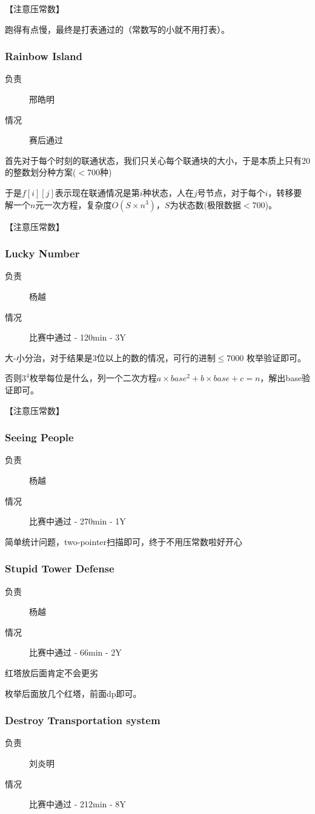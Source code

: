 \documentclass[a4paper, 11pt, nofonts, nocap, fancyhdr]{ctexart}
\newcommand{\problem}[1]{\subsubsection{#1}}
\begin{document}
【注意压常数】

跑得有点慢，最终是打表通过的（常数写的小就不用打表）。

\problem{Rainbow Island}

\begin{description}
\item[负责] 邢皓明
\item[情况] 赛后通过
\end{description}

首先对于每个时刻的联通状态，我们只关心每个联通块的大小，于是本质上只有20的整数划分种方案($<700$种)

于是$f[i][j]$表示现在联通情况是第$i$种状态，人在$j$号节点，对于每个$i$，转移要解一个$n$元一次方程，复杂度$O(S \times n^3)$，$S$为状态数(极限数据$<700$)。

【注意压常数】

\problem{Lucky Number}

\begin{description}
\item[负责] 杨越
\item[情况] 比赛中通过 - 120min - 3Y
\end{description}

大-小分治，对于结果是3位以上的数的情况，可行的进制$\leq 7000$ 枚举验证即可。

否则$3^4$枚举每位是什么，列一个二次方程$a\times base^2+b\times base+c=n$，解出base验证即可。

【注意压常数】

\problem{Seeing People}

\begin{description}
\item[负责] 杨越
\item[情况] 比赛中通过 - 270min - 1Y
\end{description}

简单统计问题，two-pointer扫描即可，终于不用压常数啦好开心

\problem{Stupid Tower Defense}

\begin{description}
\item[负责] 杨越
\item[情况] 比赛中通过 - 66min - 2Y
\end{description}

红塔放后面肯定不会更劣

枚举后面放几个红塔，前面dp即可。

\problem{Destroy Transportation system}

\begin{description}
\item[负责] 刘炎明
\item[情况] 比赛中通过 - 212min - 8Y
\end{description}
\end{document}

